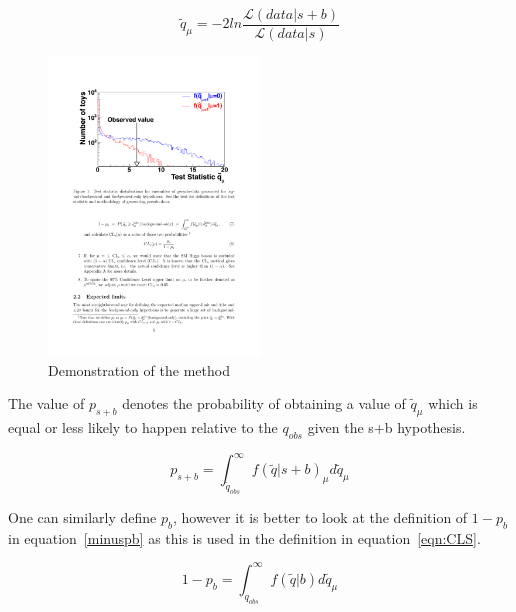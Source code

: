 \begin{equation}
\tilde{q}_{\mu} = -2ln\frac{\mathcal{L}\left(data|s+b\right)}{\mathcal{L}\left(data|s\right)}
\label{eqn:testStat}
\end{equation}


\begin{figure}[ht!]
\centering
    \includegraphics[width=0.5\textwidth]{images/Analysis/CLSdemo.pdf}
    \caption{Demonstration of the \CLS method~\cite{CMS-NOTE-2011-005}}
    \label{fig:CLSdemo}
\end{figure}

The value of $p_{s+b}$ denotes the probability of obtaining a value of $\tilde{q}_{\mu}$ which is equal or less likely to happen relative to the $q_{obs}$ given the s+b hypothesis.

\begin{equation}
p_{s+b} = \int_{\tilde{q}_{obs}}^{\infty} f\left(\tilde{q} | s+b   \right)_{\mu} d\tilde{q}_{\mu}
\end{equation}

One can similarly define $p_{b}$, however it is better to look at the definition of $1-p_{b}$ in equation~\ref{minuspb} as this is used in the \CLS definition in equation~\ref{eqn:CLS}.

\begin{equation}
1-p_{b} = \int_{q_{obs}}^{\infty} f\left(\tilde{q} |b   \right) d\tilde{q}_{\mu}
\label{eqn:minuspb}
\end{equation}


